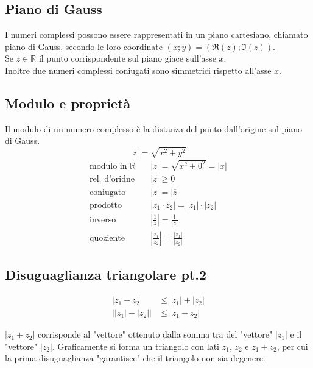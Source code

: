 \documentclass[a4paper]{article}
\begin{document}
\subsection{Piano di Gauss}
I numeri complessi possono essere rappresentati in un piano cartesiano, chiamato piano di Gauss, secondo le loro coordinate \(\left( x; y \right) = \left( \Re(z); \Im(z) \right)\). \\
Se \(z \in \mathbb{R}\) il punto corrispondente sul piano giace sull'asse \(x\). \\
Inoltre due numeri complessi coniugati sono simmetrici rispetto all'asse \(x\).


\subsection{Modulo e proprietà}
Il modulo di un numero complesso è la distanza del punto dall'origine sul piano di Gauss.
\[ \left| z \right| = \sqrt{x^2 + y^2}\]
\begin{align*}
	\text{modulo in } \mathbb{R} \quad & \left| z \right| = \sqrt{x^2 + 0^2} = \left| x \right| \\
	\text{rel. d'oridne} \quad & \left| z \right| \geq 0 \quad \\
	\text{coniugato} \quad & \left| z \right| = \left| \overline{z} \right| \\
	\text{prodotto} \quad & \left| z_1 \cdot z_2 \right| = \left| z_1 \right| \cdot \left| z_2 \right| \\
	\text{inverso} \quad & \left| \frac{1}{z} \right| = \frac{1}{\left| z \right|} \\
	\text{quoziente} \quad & \left| \frac{z_1}{z_2} \right| = \frac{\left| z_1 \right|}{\left| z_2 \right|} 
\end{align*}


\subsection{Disuguaglianza triangolare pt.2}
\begin{align*}
	\left| z_1 + z_2 \right| &\leq \left| z_1 \right| + \left| z_2 \right| \\
	\left| \left| z_1 \right| - \left| z_2 \right| \right| &\leq \left| z_1 - z_2 \right|
\end{align*}

\(\left| z_1 + z_2 \right|\) corrisponde al "vettore" ottenuto dalla somma tra del "vettore" \(\left| z_1 \right|\) e il "vettore" \(\left| z_2 \right|\).
Graficamente si forma un triangolo con lati \(z_1\), \(z_2\) e \(z_1 + z_2\), per cui la prima disuguaglianza "garantisce" che il triangolo non sia degenere.
\end{document}
